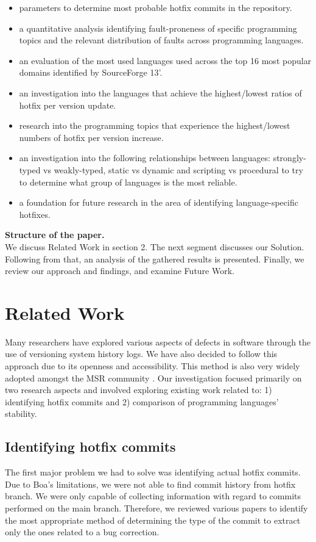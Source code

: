 \begin{itemize}
  \item parameters to determine most probable hotfix commits in the repository.
  \item a quantitative analysis identifying fault-proneness of specific programming topics and the relevant distribution of faults across programming languages.
  \item an evaluation of the most used languages used across the top 16 most popular domains identified by SourceForge 13'.
  \item an investigation into the languages that achieve the highest/lowest ratios of hotfix per version update.
  \item research into the programming topics that experience the highest/lowest numbers of hotfix per version increase.
  \item an investigation into the following relationships between languages: strongly-typed vs weakly-typed, static vs dynamic and scripting vs procedural to try to determine what group of languages is the most reliable.
  \item a foundation for future research in the area of identifying language-specific hotfixes.
\end{itemize}
\par
\textbf{Structure of the paper.}\\
We discuss Related Work in section 2. The next segment discusses our Solution. Following from that, an analysis of the gathered results is presented. Finally, we review our approach and findings, and examine Future Work.


\section{Related Work}
Many researchers have explored various aspects of defects in software through the use of versioning system history logs. We have also decided to follow this approach due to its openness and accessibility. This method is also very widely adopted amongst the MSR community \cite{Hattori2008}. Our investigation focused primarily on two research aspects and involved exploring existing work related to: 1) identifying hotfix commits and 2) comparison of programming languages' stability.


\subsection{Identifying hotfix commits}
The first major problem we had to solve was identifying actual hotfix commits. Due to Boa's limitations, we were not able to find commit history from hotfix branch. We were only capable of collecting information with regard to commits performed on the main branch. Therefore, we reviewed various papers to identify the most appropriate method of determining the type of the commit to extract only the ones related to a bug correction.\par

